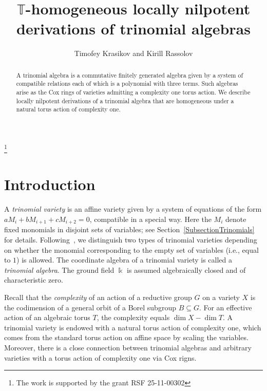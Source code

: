 \documentclass[a4paper,reqno,12pt]{amsart}
\title{$\mathbb T$-homogeneous locally nilpotent derivations of trinomial algebras}
\date{}
\author{Timofey Krasikov and Kirill Rassolov}
\theoremstyle{plain}
\theoremstyle{definition}
\theoremstyle{plain}
\theoremstyle{remark}
\newcommand{\kk}{\Bbbk}
\begin{document}
\begin{abstract}
    A trinomial algebra is a commutative finitely generated algebra given by a system of compatible relations each of which is a polynomial with three terms. Such algebras arise as the Cox rings of varieties admitting a complexity one torus action. We describe locally nilpotent derivations of a trinomial algebra that are homogeneous under a natural torus action of complexity one.
\end{abstract}

\thanks{The work is supported by the grant RSF 25-11-00302}

\maketitle

\section*{Introduction}
A \textit{trinomial variety} is an affine variety given by a system of equations of the form $aM_i+bM_{i+1}+cM_{i+2}=0$, compatible in a special way. Here the $M_i$ denote fixed monomials in disjoint sets of variables; see Section~\ref{SubsectionTrinomials} for details. Following~\cite{HW}, we distinguish two types of trinomial varieties depending on whether the monomial corresponding to the empty set of variables (i.e., equal to $1$) is allowed. The coordinate algebra of a trinomial variety is called a \textit{trinomial algebra}. The ground field $\kk$ is assumed algebraically closed and of characteristic zero.

Recall that the \emph{complexity} of an action of a reductive group $G$ on a variety $X$ is the codimension of a general orbit of a Borel subgroup $B\subseteq G$. For an effective action of an algebraic torus $T$, the complexity equals $\dim X - \dim T$. A trinomial variety is endowed with a natural torus action of complexity one, which comes from the standard torus action on affine space by scaling the variables. Moreover, there is a close connection between trinomial algebras and arbitrary varieties with a torus action of complexity one via Cox rigns. %
\end{document}
